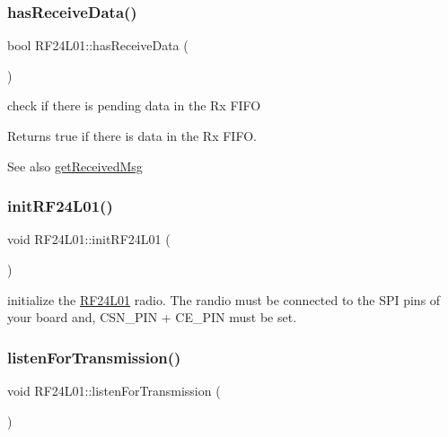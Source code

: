\subsubsection{\texorpdfstring{has\+Receive\+Data()}{hasReceiveData()}}
{\footnotesize\ttfamily bool R\+F24\+L01\+::has\+Receive\+Data (\begin{DoxyParamCaption}{ }\end{DoxyParamCaption})}

check if there is pending data in the Rx F\+I\+FO \begin{DoxyReturn}{Returns}
true if there is data in the Rx F\+I\+FO. 
\end{DoxyReturn}
\begin{DoxySeeAlso}{See also}
\mbox{\hyperlink{namespace_r_f24_l01_af736b8bca2870b8cbf49fda37e1b2b7c}{get\+Received\+Msg}} 
\end{DoxySeeAlso}
\mbox{\label{namespace_r_f24_l01_ad724bae93ed3edb7ba1c151d4bdf9f49}} 
\subsubsection{\texorpdfstring{init\+R\+F24\+L01()}{initRF24L01()}}
{\footnotesize\ttfamily void R\+F24\+L01\+::init\+R\+F24\+L01 (\begin{DoxyParamCaption}{ }\end{DoxyParamCaption})}

initialize the \mbox{\hyperlink{namespace_r_f24_l01}{R\+F24\+L01}} radio. The randio must be connected to the S\+PI pins of your board and, C\+S\+N\+\_\+\+P\+IN + C\+E\+\_\+\+P\+IN must be set. \mbox{\label{namespace_r_f24_l01_a67f6d1410d0de10ae0f6e9a5a8c58760}} 
\subsubsection{\texorpdfstring{listen\+For\+Transmission()}{listenForTransmission()}}
{\footnotesize\ttfamily void R\+F24\+L01\+::listen\+For\+Transmission (\begin{DoxyParamCaption}{ }\end{DoxyParamCaption})}

